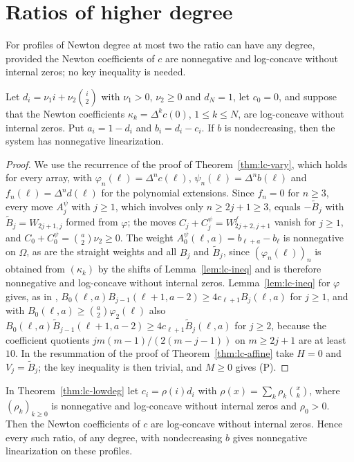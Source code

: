 \section{Ratios of higher degree}\label{sec:higher}
For profiles of Newton degree at most two the ratio can have any degree, provided the Newton coefficients of $c$ are nonnegative and log-concave without internal zeros; no key inequality is needed.

\begin{theorem}\label{thm:lc-lowdeg}
Let $d_i=\nu_1i+\nu_2\binom i2$ with $\nu_1>0$, $\nu_2\geq0$ and $d_N=1$, let $c_0=0$, and suppose that the Newton coefficients $\kappa_k=\Delta^kc(0)$, $1\leq k\leq N$, are log-concave without internal zeros. Put $a_i=1-d_i$ and $b_i=d_i-c_i$. If $b$ is nondecreasing, then the system has nonnegative linearization.
\end{theorem}

\begin{proof}
We use the recurrence of the proof of Theorem~\ref{thm:lc-vary}, which holds for every array, with $\varphi_n(\ell)=\Delta^nc(\ell)$, $\psi_n(\ell)=\Delta^nb(\ell)$ and $f_n(\ell)=\Delta^nd(\ell)$ for the polynomial extensions. Since $f_n=0$ for $n\geq3$, every move $A^\psi_j$ with $j\geq1$, which involves only $n\geq2j+1\geq3$, equals $-\widetilde B_j$ with $\widetilde B_j=W_{2j+1,j}$ formed from $\varphi$; the moves $C_j+C^\psi_j=W^f_{2j+2,j+1}$ vanish for $j\geq1$, and $C_0+C^\psi_0=\binom a2\nu_2\geq0$. The weight $A^\psi_0(\ell,a)=b_{\ell+a}-b_\ell$ is nonnegative on $\Omega$, as are the straight weights and all $B_j$ and $\widetilde B_j$, since $(\varphi_n(\ell))_n$ is obtained from $(\kappa_k)$ by the shifts of Lemma~\ref{lem:lc-ineq} and is therefore nonnegative and log-concave without internal zeros. Lemma~\ref{lem:lc-ineq} for $\varphi$ gives, as in \cite[Lemma~]{P1}, $B_0(\ell,a)B_{j-1}(\ell+1,a-2)\geq4c_{\ell+1}B_j(\ell,a)$ for $j\geq1$, and with $B_0(\ell,a)\geq\binom a2\varphi_2(\ell)$ also $B_0(\ell,a)\widetilde B_{j-1}(\ell+1,a-2)\geq4c_{\ell+1}\widetilde B_j(\ell,a)$ for $j\geq2$, because the coefficient quotients $jm(m-1)/(2(m-j-1))$ on $m\geq2j+1$ are at least $10$. In the resummation of the proof of Theorem~\ref{thm:lc-affine} take $H=0$ and $V_j=\widetilde B_j$; the key inequality is then trivial, and $M\geq0$ gives (P).
\end{proof}

\begin{corollary}\label{cor:lc-lowdeg}
In Theorem~\ref{thm:lc-lowdeg} let $c_i=\rho(i)d_i$ with $\rho(x)=\sum_k\rho_k\binom xk$, where $(\rho_k)_{k\geq0}$ is nonnegative and log-concave without internal zeros and $\rho_0>0$. Then the Newton coefficients of $c$ are log-concave without internal zeros. Hence every such ratio, of any degree, with nondecreasing $b$ gives nonnegative linearization on these profiles.
\end{corollary}

